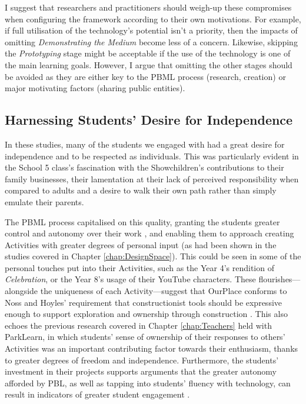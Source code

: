 I suggest that researchers and practitioners should weigh-up these compromises when configuring the framework according to their own motivations. For example, if full utilisation of the technology's potential isn't a priority, then the impacts of omitting \textit{Demonstrating the Medium} become less of a concern. Likewise, skipping the \textit{Prototyping} stage might be acceptable if the use of the technology is one of the main learning goals. However, I argue that omitting the other stages should be avoided as they are either key to the PBML process (research, creation) or major motivating factors (sharing public entities).

\subsection{Harnessing Students' Desire for Independence}
In these studies, many of the students we engaged with had a great desire for independence and to be respected as individuals. This was particularly evident in the School 5 class's fascination with the Showchildren's contributions to their family businesses, their lamentation at their lack of perceived responsibility when compared to adults and a desire to walk their own path rather than simply emulate their parents.

The PBML process capitalised on this quality, granting the students greater control and autonomy over their work \citep{Noss2017, Wurdinger2007}, and enabling them to approach creating Activities with greater degrees of personal input (as had been shown in the studies covered in Chapter \ref{chap:DesignSpace}). This could be seen in some of the personal touches put into their Activities, such as the Year 4's rendition of \textit{Celebration}, or the Year 8's usage of their YouTube characters. These flourishes---alongside the uniqueness of each Activity---suggest that OurPlace conforms to Noss and Hoyles' requirement that constructionist tools should be expressive enough to support exploration and ownership through construction \citep{Noss2017}. This also echoes the previous research covered in Chapter \ref{chap:Teachers} held with ParkLearn, in which students' sense of ownership of their responses to others' Activities was an important contributing factor towards their enthusiasm, thanks to greater degrees of freedom and independence. Furthermore, the students' investment in their projects supports arguments that the greater autonomy afforded by PBL, as well as tapping into students' fluency with technology, can result in indicators of greater student engagement \citep{Wurdinger2007, Bell2010}.

